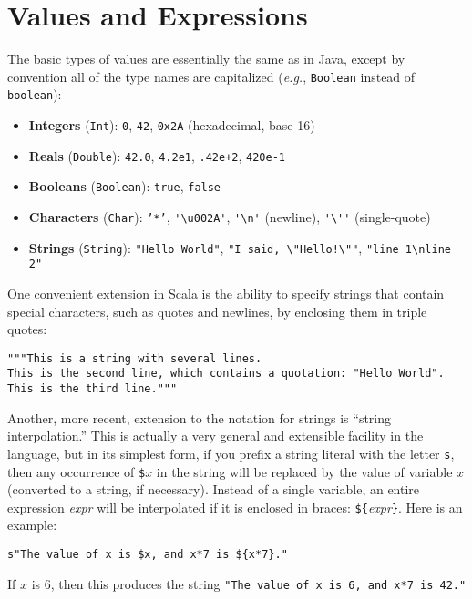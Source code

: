 \documentclass[11pt]{article}
\begin{document}
\section{Values and Expressions}
The basic types of values are essentially the same as in Java, except by convention all of the type names are capitalized (\textit{e.g.}, \texttt{Boolean} instead of \texttt{boolean}):
\begin{itemize}
\item \textbf{Integers} (\texttt{Int}): \texttt{0}, \texttt{42}, \texttt{0x2A} (hexadecimal, base-16)

\item \textbf{Reals} (\texttt{Double}): \texttt{42.0}, \texttt{4.2e1}, \texttt{.42e+2}, \texttt{420e-1}

\item \textbf{Booleans} (\texttt{Boolean}): \texttt{true}, \texttt{false}

\item \textbf{Characters} (\texttt{Char}): \texttt{'*'}, \verb|'\u002A'|, \verb|'\n'| (newline), \verb|'\''| (single-quote)

\item \textbf{Strings} (\texttt{String}): \texttt{"Hello World"}, \verb|"I said, \"Hello!\""|, \verb|"line 1\nline 2"|
\end{itemize}
One convenient extension in Scala is the ability to specify strings that contain special characters, such as quotes and newlines, by enclosing them in triple quotes:
\begin{verbatim}
"""This is a string with several lines.
This is the second line, which contains a quotation: "Hello World".
This is the third line."""
\end{verbatim}
Another, more recent, extension to the notation for strings is ``string interpolation.'' This is actually a very general and extensible facility in the language, but in its simplest form, if you prefix a string literal with the letter \verb|s|, then any occurrence of \verb|$|$x$ in the string will be replaced by the value of variable $x$ (converted to a string, if necessary). Instead of a single variable, an entire expression \textit{expr} will be interpolated if it is enclosed in braces: \verb|${|\textit{expr}\verb|}|. Here is an example:
\begin{verbatim}
s"The value of x is $x, and x*7 is ${x*7}."
\end{verbatim}
If $x$ is 6, then this produces the string \verb|"The value of x is 6, and x*7 is 42."|
\end{document}
